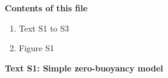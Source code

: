 \documentclass[draft,grl]{agutexSI}
\begin{document}
\begin{article}

%
%



\noindent\textbf{Contents of this file}
\begin{enumerate}
\item Text S1 to S3
\item Figure S1
\end{enumerate}


\clearpage

\noindent\textbf{Text S1: Simple zero-buoyancy model}
%


\end{article}
\end{document}
